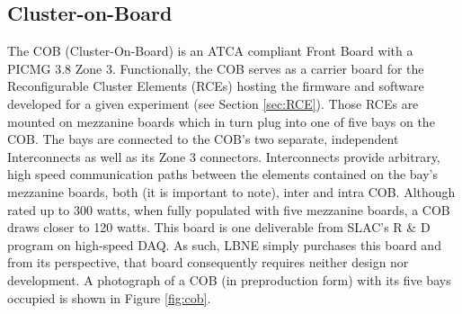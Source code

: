 

\subsection{Cluster-on-Board}
\label{sec:COB}
The COB (Cluster-On-Board) is an ATCA compliant Front Board with a PICMG 3.8 Zone 3. 
Functionally, the COB serves as a carrier board for the Reconfigurable Cluster
Elements (RCEs) hosting the firmware and software developed for 
a given experiment (see Section \ref{sec:RCE}). 
Those RCEs are mounted on mezzanine boards 
which in turn plug into one of five bays on the COB. 
The bays are connected to the COB's two separate, 
independent Interconnects as well as its Zone 3 connectors. 
Interconnects provide arbitrary, high speed communication 
paths between the elements contained on the bay's mezzanine boards,
both (it is important to note), inter and intra COB.
Although rated up to 300 watts, when fully populated with five mezzanine boards, 
a COB draws closer to 120 watts. 
This board is one deliverable from SLAC's R \& D program on high-speed DAQ. 
As such, LBNE simply purchases this board and from its perspective, 
that board consequently requires neither design nor development.
A photograph of a COB (in preproduction form) with its five bays 
occupied is shown in Figure \ref{fig:cob}.


